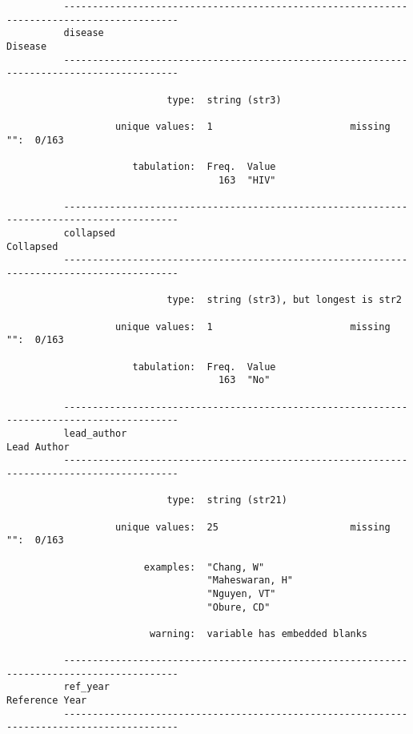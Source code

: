 \documentclass{article}
\begin{document}
\begin{verbatim}
          
          
          
          ------------------------------------------------------------------------------------------
          disease                                                                            Disease
          ------------------------------------------------------------------------------------------
          
                            type:  string (str3)
          
                   unique values:  1                        missing "":  0/163
          
                      tabulation:  Freq.  Value
                                     163  "HIV"
          
          ------------------------------------------------------------------------------------------
          collapsed                                                                        Collapsed
          ------------------------------------------------------------------------------------------
          
                            type:  string (str3), but longest is str2
          
                   unique values:  1                        missing "":  0/163
          
                      tabulation:  Freq.  Value
                                     163  "No"
          
          ------------------------------------------------------------------------------------------
          lead_author                                                                    Lead Author
          ------------------------------------------------------------------------------------------
          
                            type:  string (str21)
          
                   unique values:  25                       missing "":  0/163
          
                        examples:  "Chang, W"
                                   "Maheswaran, H"
                                   "Nguyen, VT"
                                   "Obure, CD"
          
                         warning:  variable has embedded blanks
          
          ------------------------------------------------------------------------------------------
          ref_year                                                                    Reference Year
          ------------------------------------------------------------------------------------------
          

\end{verbatim}
\end{document}
